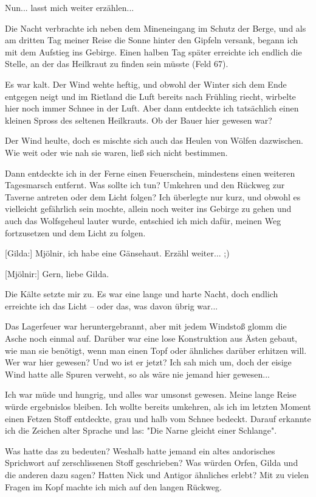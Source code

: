 \documentclass[10pt, a4paper, oneside]{book}
\begin{document}
\begin{multicols}{2}
Nun... lasst mich weiter erzählen...

Die Nacht verbrachte ich neben dem Mineneingang im Schutz der Berge, und als am dritten Tag meiner Reise die Sonne hinter den Gipfeln versank, begann ich mit dem Aufstieg ins Gebirge. Einen halben Tag später erreichte ich endlich die Stelle, an der das Heilkraut zu finden sein müsste (Feld 67).

Es war kalt. Der Wind wehte heftig, und obwohl der Winter sich dem Ende entgegen neigt und im Rietland die Luft bereits nach Frühling riecht, wirbelte hier noch immer Schnee in der Luft. Aber dann entdeckte ich tatsächlich einen kleinen Spross des seltenen Heilkrauts. Ob der Bauer hier gewesen war?

Der Wind heulte, doch es mischte sich auch das Heulen von Wölfen dazwischen. Wie weit oder wie nah sie waren, ließ sich nicht bestimmen.

Dann entdeckte ich in der Ferne einen Feuerschein, mindestens einen weiteren Tagesmarsch entfernt. Was sollte ich tun? Umkehren und den Rückweg zur Taverne antreten oder dem Licht folgen? Ich überlegte nur kurz, und obwohl es vielleicht gefährlich sein mochte, allein noch weiter ins Gebirge zu gehen und auch das Wolfsgeheul lauter wurde, entschied ich mich dafür, meinen Weg fortzusetzen und dem Licht zu folgen.

[Gilda:] Mjölnir, ich habe eine Gänsehaut. Erzähl weiter... ;)

[Mjölnir:] Gern, liebe Gilda.

Die Kälte setzte mir zu. Es war eine lange und harte Nacht, doch endlich erreichte ich das Licht – oder das, was davon übrig war...

Das Lagerfeuer war heruntergebrannt, aber mit jedem Windstoß glomm die Asche noch einmal auf. Darüber war eine lose Konstruktion aus Ästen gebaut, wie man sie benötigt, wenn man einen Topf oder ähnliches darüber erhitzen will. Wer war hier gewesen? Und wo ist er jetzt? Ich sah mich um, doch der eisige Wind hatte alle Spuren verweht, so als wäre nie jemand hier gewesen...

Ich war müde und hungrig, und alles war umsonst gewesen. Meine lange Reise würde ergebnislos bleiben. Ich wollte bereits umkehren, als ich im letzten Moment einen Fetzen Stoff entdeckte, grau und halb vom Schnee bedeckt. Darauf erkannte ich die Zeichen alter Sprache und las: "Die Narne gleicht einer Schlange".

Was hatte das zu bedeuten? Weshalb hatte jemand ein altes andorisches Sprichwort auf zerschlissenen Stoff geschrieben? Was würden Orfen, Gilda und die anderen dazu sagen? Hatten Nick und Antigor ähnliches erlebt? Mit zu vielen Fragen im Kopf machte ich mich auf den langen Rückweg.


\end{multicols}
\end{document}
